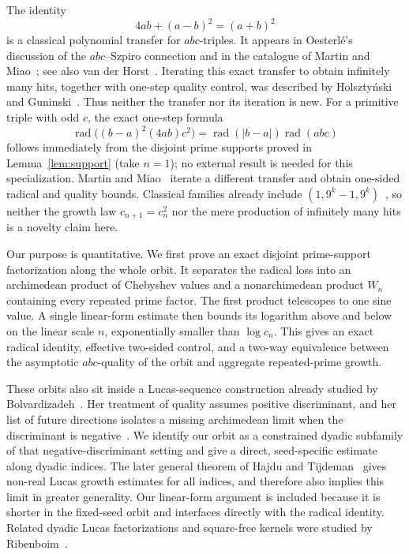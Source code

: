 \documentclass[11pt]{article}
\theoremstyle{remark}
\newcommand{\rad}{\operatorname{rad}}
\begin{document}
The identity
\[
 4ab+(a-b)^2=(a+b)^2                                      \tag{1.1}
\]
is a classical polynomial transfer for \(abc\)-triples.  It appears in
Oesterl\'e's discussion of the \(abc\)--Szpiro connection
\cite[p.~170]{Oesterle1988} and in the catalogue of Martin and
Miao~\cite[\S2.4]{MartinMiao2016}; see also
van der Horst~\cite[\S2.3]{vanderHorst2010}.  Iterating this exact
transfer to obtain infinitely many hits, together with one-step quality
control, was described by Holszty\'nski~\cite{Holsztynski2017} and
Guninski~\cite{Guninski2020}.  Thus neither the transfer nor its
iteration is new.  For a primitive triple with odd \(c\), the exact
one-step formula
\[
 \rad\bigl((b-a)^2(4ab)c^2\bigr)
 =\rad(|b-a|)\rad(abc)
\]
follows immediately from the disjoint prime supports proved in
Lemma~\ref{lem:support} (take \(n=1\)); no external result is needed
for this specialization.
Martin and Miao~\cite[\S3.1]{MartinMiao2016} iterate a different
transfer and obtain one-sided radical and quality bounds.
Classical families already include
\((1,9^k-1,9^k)\)~\cite{AlvarezEtAl2023}, so neither the growth law
\(c_{n+1}=c_n^2\) nor the mere production of infinitely many hits is a
novelty claim here.

Our purpose is quantitative.  We first prove an exact disjoint
prime-support factorization along the whole orbit.  It separates the
radical loss into an archimedean product of Chebyshev values and a
nonarchimedean product \(W_n\) containing every repeated prime factor.
The first product telescopes to one sine value.  A single linear-form
estimate then bounds its logarithm above and below on the linear scale
\(n\), exponentially smaller than \(\log c_n\).  This gives an exact
radical identity, effective two-sided control, and a two-way equivalence
between the asymptotic \(abc\)-quality of the orbit and aggregate
repeated-prime growth.

These orbits also sit inside a Lucas-sequence construction already
studied by Bolvardizadeh~\cite[Ch.~2]{Bolvardizadeh2023}.  Her treatment
of quality assumes positive discriminant, and her list of future
directions isolates a missing archimedean limit when the discriminant is
negative~\cite[pp.~63--64]{Bolvardizadeh2023}.  We identify our orbit as
a constrained dyadic subfamily of that negative-discriminant setting and
give a direct, seed-specific estimate along dyadic indices.  The later
general theorem of Hajdu and Tijdeman~\cite[Theorem~2.1 and
Remark~1]{HajduTijdeman2025} gives non-real Lucas growth estimates for
all indices, and therefore also implies this limit in greater
generality.  Our linear-form argument is included because it is shorter
in the fixed-seed orbit and interfaces directly with the radical
identity.  Related dyadic Lucas factorizations and square-free kernels
were studied by Ribenboim~\cite{Ribenboim2002}.
\end{document}
